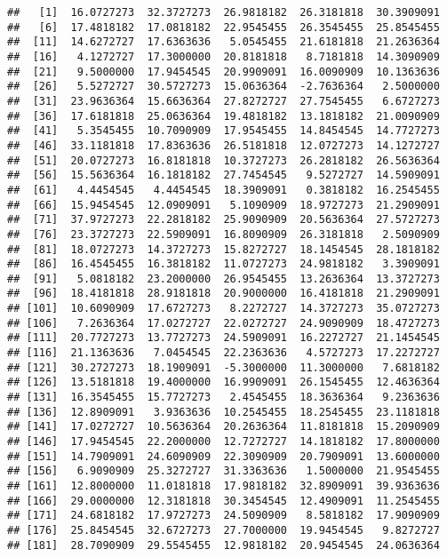 \documentclass[]{book}
\begin{document}
\begin{verbatim}
##   [1]  16.0727273  32.3727273  26.9818182  26.3181818  30.3909091
##   [6]  17.4818182  17.0818182  22.9545455  26.3545455  25.8545455
##  [11]  14.6272727  17.6363636   5.0545455  21.6181818  21.2636364
##  [16]   4.1272727  17.3000000  20.8181818   8.7181818  14.3090909
##  [21]   9.5000000  17.9454545  20.9909091  16.0090909  10.1363636
##  [26]   5.5272727  30.5727273  15.0636364  -2.7636364   2.5000000
##  [31]  23.9636364  15.6636364  27.8272727  27.7545455   6.6727273
##  [36]  17.6181818  25.0636364  19.4818182  13.1818182  21.0090909
##  [41]   5.3545455  10.7090909  17.9545455  14.8454545  14.7727273
##  [46]  33.1181818  17.8363636  26.5181818  12.0727273  14.1272727
##  [51]  20.0727273  16.8181818  10.3727273  26.2818182  26.5636364
##  [56]  15.5636364  16.1818182  27.7454545   9.5272727  14.5909091
##  [61]   4.4454545   4.4454545  18.3909091   0.3818182  16.2545455
##  [66]  15.9454545  12.0909091   5.1090909  18.9727273  21.2909091
##  [71]  37.9727273  22.2818182  25.9090909  20.5636364  27.5727273
##  [76]  23.3727273  22.5909091  16.8090909  26.3181818   2.5090909
##  [81]  18.0727273  14.3727273  15.8272727  18.1454545  28.1818182
##  [86]  16.4545455  16.3818182  11.0727273  24.9818182   3.3909091
##  [91]   5.0818182  23.2000000  26.9545455  13.2636364  13.3727273
##  [96]  18.4181818  28.9181818  20.9000000  16.4181818  21.2909091
## [101]  10.6090909  17.6727273   8.2272727  14.3727273  35.0727273
## [106]   7.2636364  17.0272727  22.0272727  24.9090909  18.4727273
## [111]  20.7727273  13.7727273  24.5909091  16.2272727  21.1454545
## [116]  21.1363636   7.0454545  22.2363636   4.5727273  17.2272727
## [121]  30.2727273  18.1909091  -5.3000000  11.3000000   7.6818182
## [126]  13.5181818  19.4000000  16.9909091  26.1545455  12.4636364
## [131]  16.3545455  15.7727273   2.4545455  18.3636364   9.2363636
## [136]  12.8909091   3.9363636  10.2545455  18.2545455  23.1181818
## [141]  17.0272727  10.5636364  20.2636364  11.8181818  15.2090909
## [146]  17.9454545  22.2000000  12.7272727  14.1818182  17.8000000
## [151]  14.7909091  24.6090909  22.3090909  20.7909091  13.6000000
## [156]   6.9090909  25.3272727  31.3363636   1.5000000  21.9545455
## [161]  12.8000000  11.0181818  17.9818182  32.8909091  39.9363636
## [166]  29.0000000  12.3181818  30.3454545  12.4909091  11.2545455
## [171]  24.6818182  17.9727273  24.5090909   8.5818182  17.9090909
## [176]  25.8454545  32.6727273  27.7000000  19.9454545   9.8272727
## [181]  28.7090909  29.5545455  12.9818182  20.9454545  24.0636364

\end{verbatim}
\end{document}
